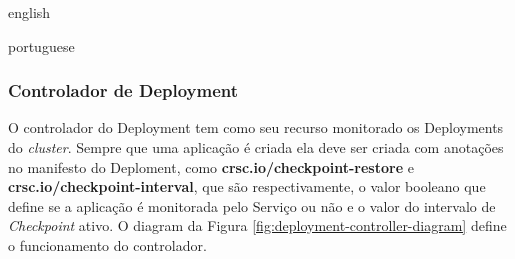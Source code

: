 \begin{otherlanguage*}{english}
\begin{otherlanguage*}{portuguese}
\subsubsection{Controlador de Deployment}

O controlador do Deployment tem como seu recurso monitorado os Deployments do
\textit{cluster}. Sempre que uma aplicação é criada ela deve ser criada com anotações
no manifesto do Deploment, como \textbf{crsc.io/checkpoint-restore} e
\textbf{crsc.io/checkpoint-interval}, que são respectivamente, o valor booleano que
define se a aplicação é monitorada pelo Serviço ou não e o valor do intervalo de
\textit{Checkpoint} ativo. O diagram da Figura \ref{fig:deployment-controller-diagram}
define o funcionamento do controlador.

\begin{figure}[h]
\centering

\end{figure}
\end{otherlanguage*}
\end{otherlanguage*}

